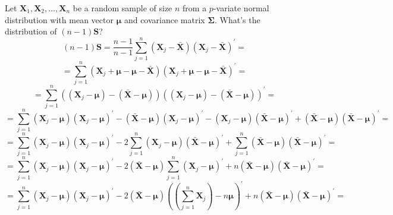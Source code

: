 \documentclass{article}
\begin{document}
Let $\textbf{X}_{1}, \textbf{X}_{2}, \dots, \textbf{X}_{n}$ be a random sample of size $n$ from a $p$-variate normal distribution with mean vector $\bm{\mu}$ and covariance matrix $\bm{\Sigma}$. What's the distribution of $(n-1)\textbf{S}$?
    \[
        (n-1)\textbf{S}
        =
        \frac{n-1}{n -1}
        \sum_{j=1}^{n}{
            \left(\textbf{X}_{j} - \bar{\textbf{X}}\right)
            {\left(\textbf{X}_{j} - \bar{\textbf{X}}\right)}^{\prime}
        }
        =
    \]
    \[
        =
        \sum_{j=1}^{n}{
            \left(\textbf{X}_{j} + \bm{\mu} - \bm{\mu} - \bar{\textbf{X}}\right)
            {\left(\textbf{X}_{j} + \bm{\mu} - \bm{\mu} - \bar{\textbf{X}}\right)}^{\prime}
        }
        =
    \]
    \[
        =
        \sum_{j=1}^{n}{
            \left((\textbf{X}_{j} - \bm{\mu}) - (\bar{\textbf{X}} - \bm{\mu})\right)
            {\left((\textbf{X}_{j} - \bm{\mu}) - (\bar{\textbf{X}} - \bm{\mu})\right)}^{\prime}
        }
        =
    \]
    \[
        =
        \scriptstyle{
        \sum_{j=1}^{n}{
            (\textbf{X}_{j} - \bm{\mu}){(\textbf{X}_{j} - \bm{\mu})}^{\prime}
            -
            (\bar{\textbf{X}} - \bm{\mu}){(\textbf{X}_{j} - \bm{\mu})}^{\prime}
            -
            (\textbf{X}_{j} - \bm{\mu}){(\bar{\textbf{X}} - \bm{\mu})}^{\prime}
            +
            (\bar{\textbf{X}} - \bm{\mu}){(\bar{\textbf{X}} - \bm{\mu})}^{\prime}
        }
        }
        =
    \]
    \[
        =
        \scriptstyle{
        \sum_{j=1}^{n}{
            (\textbf{X}_{j} - \bm{\mu}){(\textbf{X}_{j} - \bm{\mu})}^{\prime}
        }
        -
        2
        \sum_{j=1}^{n}{
            (\textbf{X}_{j} - \bm{\mu}){(\bar{\textbf{X}} - \bm{\mu})}^{\prime}
        }
        +
        \sum_{j=1}^{n}{
            (\bar{\textbf{X}} - \bm{\mu}){(\bar{\textbf{X}} - \bm{\mu})}^{\prime}
        }
        }
        =
    \]
    \[
        =
        \scriptstyle{
        \sum_{j=1}^{n}{
            (\textbf{X}_{j} - \bm{\mu}){(\textbf{X}_{j} - \bm{\mu})}^{\prime}
        }
        -
        2
        (\bar{\textbf{X}} - \bm{\mu})
        \sum_{j=1}^{n}{
            {(\textbf{X}_{j} - \bm{\mu})}^{\prime}
        }
        +
        n
        (\bar{\textbf{X}} - \bm{\mu}){(\bar{\textbf{X}} - \bm{\mu})}^{\prime}
        }
        =
    \]
    \[
        =
        \scriptstyle{
        \sum_{j=1}^{n}{
            (\textbf{X}_{j} - \bm{\mu}){(\textbf{X}_{j} - \bm{\mu})}^{\prime}
        }
        -
        2
        (\bar{\textbf{X}} - \bm{\mu})
        {((\sum_{j=1}^{n}{\textbf{X}_{j}}) - n\bm{\mu})}^{\prime}
        +
        n
        (\bar{\textbf{X}} - \bm{\mu}){(\bar{\textbf{X}} - \bm{\mu})}^{\prime}
        }
        =
    \]
\end{document}
